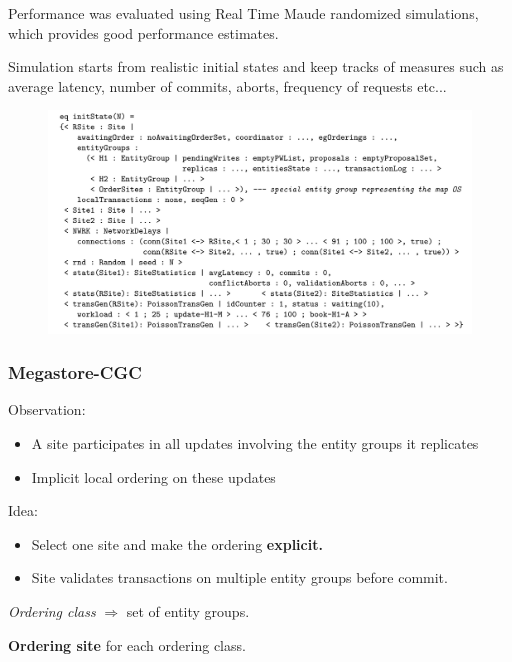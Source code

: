 \documentclass{beamer}
\begin{document}
\begin{frame}
    \scriptsize
    Performance was evaluated using Real Time Maude randomized simulations, which provides good performance estimates.

    
    \bigskip
    Simulation starts from realistic initial states and keep tracks of measures such as 
    average latency, number of commits, aborts, frequency of requests etc...
    \begin{figure}
        \includegraphics[width=\textwidth,height=\textheight,keepaspectratio]{img/init.png}
    \end{figure}
\end{frame}
\begin{frame}
\frametitle{Megastore-CGC}

    Observation:
    \begin{itemize}
        \item A site participates in all updates involving the entity groups it replicates 
        \item Implicit local ordering on these updates
    \end{itemize}  
            
    Idea:
    \begin{itemize}
        \item Select one site and make the ordering \textbf{explicit.}
        \item Site validates transactions on multiple entity groups before commit.
    \end{itemize}

    \emph{Ordering class} $\Rightarrow$ set of entity groups.

    \textbf{Ordering site} for each ordering class.
\end{frame}
\end{document}

